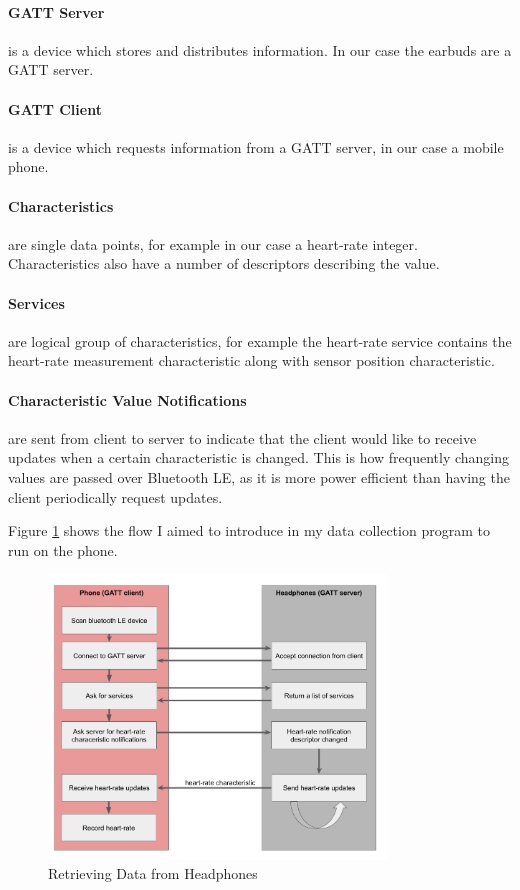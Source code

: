 \documentclass[12pt,a4paper,twoside,openright]{report}
\begin{document}
\paragraph{GATT Server} is a device which stores and distributes information. In
our case the earbuds are a GATT server.

\paragraph{GATT Client} is a device which requests information from a GATT
server, in our case a mobile phone.

\paragraph{Characteristics} are single data points, for example in our case a
heart-rate integer. Characteristics also have a number of descriptors
describing the value.

\paragraph{Services} are logical group of characteristics, for example the
heart-rate service contains the heart-rate measurement characteristic along
with sensor position characteristic.

\paragraph{Characteristic Value Notifications} are sent from client to server
to indicate that the client would like to receive updates when a certain
characteristic is changed. This is how frequently changing values are passed
over Bluetooth LE, as it is more power efficient than having the client
periodically request updates.

Figure \ref{fig:gatt-flow} shows the flow I aimed to introduce in my data collection program to run
on the phone. 

\begin{figure}[tbh]
	\centerline{\includegraphics[width=0.8\textwidth]{figs/gatt-flow.png}}
	\caption{Retrieving Data from Headphones}
	\label{fig:gatt-flow}
\end{figure}
\end{document}
